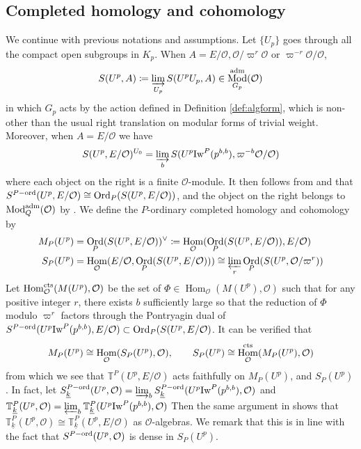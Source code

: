 \documentclass[leqno]{amsart}
\theoremstyle{definition}
\theoremstyle{remark}
\newcommand{\oo}{\mathcal{O}}
\DeclareMathOperator{\Hom}{Hom}
\newcommand{\cts}{\textnormal{cts}}
\DeclareMathOperator{\Mod}{\textnormal{Mod}}
\DeclareMathOperator{\Ord}{Ord} %
\newcommand{\adm}{\textnormal{adm}}
\newcommand{\wt}[1]{\underline{ #1 }}
\newcommand{\Iw}{\textnormal{Iw}} %
\newcommand{\TT}{\mathbb{T}} %
\newcommand{\ord}{\textnormal{ord}} %
\begin{document}
\subsection{Completed homology and cohomology}

We continue with previous notations and assumptions.
Let $\{U_p\}$ goes through
all the compact open subgroups in $K_p$.
When $A=E/\oo, \oo/\varpi^{r}\oo$ or $\varpi^{-r}\oo/\oo$, 
\begin{equation}\label{eq:complete}
	S(U^p,A)\coloneqq
	\varinjlim_{U_p}S(U^pU_p,A)\in 
	\Mod^{\adm}_{G_p}(\oo)
\end{equation}
in which $G_p$ acts by the action 
defined in Definition \ref{def:algform},
which is non-other than the usual right translation
on modular forms of trivial weight.
Moreover, when $A=E/\oo$ we have
\[
	S(U^p,E/\oo)^{U_0}=
	\varinjlim_{b}
	S(U^p\Iw^P(p^{b,b}),\varpi^{-b}\oo/\oo)
\]
where each object on the right is 
a finite $\oo$-module.
It then follows from \cite[Lem 3.1.5]{emeI} and \cite[Prop 3.2.4]{emeI}
that $S^{P-\ord}(U^p,E/\oo)\cong \Ord_P(S(U^p,E/\oo))$,
and the object on the right belongs to $\Mod^{\adm}_Q(\oo)$
by \cite[Thm 3.3.3]{emeI}.
We define the $P$-ordinary completed homology and cohomology by
\begin{align}\label{eq:completed_coh}
	M_P(U^p)&=
	\Ord_P(S(U^p,E/\oo))^\vee
	\coloneqq \Hom_\oo(\Ord_P(S(U^p,E/\oo)),E/\oo)\\
	S_P(U^p)&=\Hom_\oo(E/\oo, \Ord_P(S(U^p,E/\oo)))
	\cong \varprojlim_r \Ord_P(S(U^p,\oo/\varpi^{r}))
\end{align}
Let $\Hom_\oo^{\cts}(M(U^p),\oo)$
be the set of
$\Phi\in \Hom_\oo(M(U^p),\oo)$ 
such that for any positive integer $r$,
there exists $b$ sufficiently large so that 
the reduction of $\Phi$ modulo $\varpi^r$
factors through
the Pontryagin dual of 
$S^{P-\ord}(U^p\Iw^P(p^{b,b}),E/\oo)\subset \Ord_P(S(U^p,E/\oo)$. 
It can be verified that 
\[
	M_P(U^p)\cong \Hom_\oo(S_P(U^p),\oo),\qquad
	S_P(U^p)\cong \Hom_\oo^{\cts}(M_P(U^p),\oo)
\]
from which we see that
$\TT^P(U^p,E/\oo)$ acts faithfully
on  $M_P(U^p)$, and  $S_P(U^p)$.
In fact, 
let $S_{\wt{k}}^{P-\ord}(U^p,\oo)
=\varinjlim_{b}S_{\wt{k}}^{P-\ord}(U^p\Iw^P(p^{b,b}),\oo)$
and 
$\TT^P_{\wt{k}}(U^p,\oo)=
\varprojlim_b\TT_{\wt{k}}^{P}(U^p\Iw^P(p^{b,b}),\oo)$
Then the same argument in \cite[Lem 2.17]{ger}
shows that  $\TT^P_{\wt{k}}(U^p,\oo)\cong \TT^P_{\wt{k}}(U^p,E/\oo)$
as $\oo$-algebras.
We remark that this is in line with the fact that 
$S^{P-\ord}(U^p,\oo)$ is dense in $S_P(U^p)$.
\end{document}
